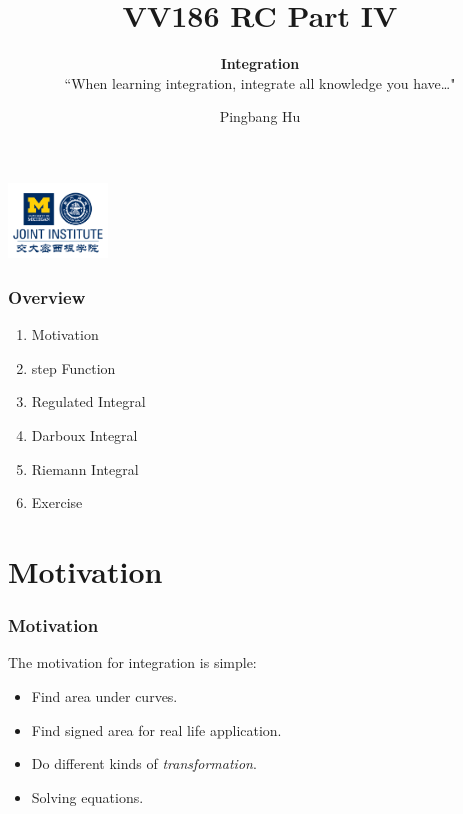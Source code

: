 \documentclass[12pt, t]{beamer}
\title{VV186 RC Part IV}
\subtitle{\textbf{Integration}\\``When learning integration, integrate all knowledge you have\dots"}
\institute[UM-SJTU JI]{University of Michigan-Shanghai Jiao Tong University Joint Institute}
\author{Pingbang Hu}
\renewcommand{\emph}[1]{{\color{Turquoise3}\textsl{#1}}}
\begin{document}
\begin{frame}
    \titlepage
    \begin{center}
        \includegraphics[height=2cm]{Figures/logo/logo2.png}
    \end{center}
\end{frame}

\begin{frame}
    \frametitle{Overview}
    \begin{enumerate}
        \item Motivation
        \item step Function
        \item Regulated Integral
        \item Darboux Integral
        \item Riemann Integral
        \item Exercise
    \end{enumerate}
\end{frame}

\section{Motivation}
\begin{frame}
    \frametitle{Motivation}
    The motivation for integration is simple:
    \begin{itemize}
        \item Find area under curves.
        \item Find signed area for real life application.
        \item Do different kinds of \emph{transformation}.
        \item Solving equations.
    \end{itemize}
\end{frame}
\end{document}
